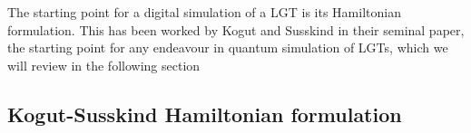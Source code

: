 The starting point for a digital simulation of a LGT is its Hamiltonian formulation.
This has been worked by Kogut and Susskind in their seminal paper\citneeded, the starting point for any endeavour in quantum simulation of LGTs, which we will review in the following section


\subsection{Kogut-Susskind Hamiltonian formulation}
\label{sub:kogut_susskind_hamiltonian_formulation}



